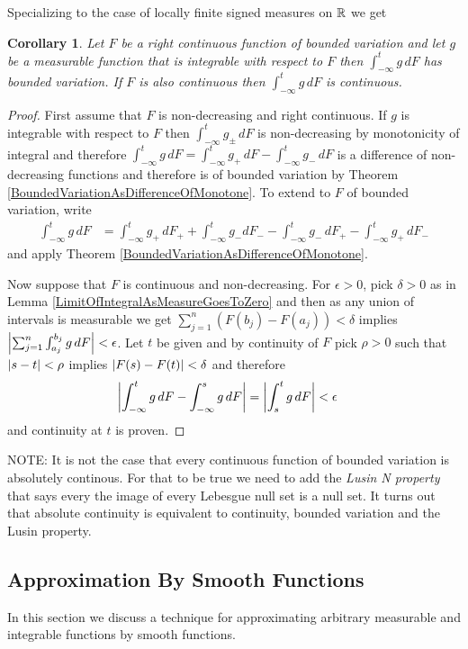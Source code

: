 \documentclass{amsart}
\newtheorem{cor}[thm]{Corollary}
\theoremstyle{remark}
\theoremstyle{definition}
\begin{document}
Specializing to the case of locally finite signed measures on $\mathbb{R}$ we get
\begin{cor}\label{StieltjesIntegralBoundedVariationAndContinuous}Let $F$ be a right continuous function of bounded variation and let $g$ be a
  measurable function that is integrable with respect to $F$ then
  $\int_{-\infty}^t g \, dF$ has bounded variation.  If $F$ is also
  continuous then $\int_{-\infty}^t g \, dF$ is continuous.
\end{cor}
\begin{proof}
First assume that $F$ is
non-decreasing and right continuous.  If $g$ is integrable with respect to $F$ then
$\int_{-\infty}^t g_\pm \, dF$ is non-decreasing by monotonicity of integral and therefore
$\int_{-\infty}^t g \, dF = \int_{-\infty}^t g_+ \, dF -
\int_{-\infty}^t g_- \, dF$ is a difference of non-decreasing
functions and therefore is of bounded variation by Theorem \ref{BoundedVariationAsDifferenceOfMonotone}.  To extend to $F$ of
bounded variation, write 
\begin{align*}
\int_{-\infty}^t g \, dF &= \int_{-\infty}^t g_+ \, dF_+ +
\int_{-\infty}^t g_- dF_- -
\int_{-\infty}^t g_- \, dF_+ - \int_{-\infty}^t g_+ \, dF_-
\end{align*}
and apply Theorem  \ref{BoundedVariationAsDifferenceOfMonotone}.

Now suppose that $F$ is continuous and non-decreasing.  For $\epsilon > 0$, pick $\delta>0$ as in Lemma
\ref{LimitOfIntegralAsMeasureGoesToZero} and then as any union of
intervals is measurable we get $\sum_{j=1}^n (F(b_j)-F(a_j)) < \delta$
implies $\left \vert \sum_{j=1}^n \int_{a_j}^{b_j} g \, dF \right \vert < \epsilon$.
Let $t$ be given and by continuity of $F$ pick $\rho > 0$ such that
$\left \vert s - t \right \vert < \rho$ implies $\left \vert F(s) - F(t) \right \vert < \delta$ and
therefore 
\begin{align*}
\left \vert \int_{-\infty}^t g \, dF - \int_{-\infty}^s g \, dF \right \vert &=
\left \vert \int_s^t g \, dF \right \vert < \epsilon
\end{align*}
and continuity at $t$ is proven.
\end{proof}

NOTE:  It is not the case that every continuous function of bounded
variation is absolutely continous.  For that to be true we need to add
the \emph{Lusin N property} that says every the image of every Lebesgue
null set is a null set.  It turns out that absolute continuity is
equivalent to continuity, bounded variation and the Lusin property.

\subsection{Approximation By Smooth Functions}
In this section we discuss a technique for approximating arbitrary
measurable and integrable functions by smooth functions.  
\end{document}
